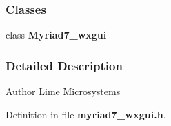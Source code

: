 \subsubsection*{Classes}
\begin{DoxyCompactItemize}
\item 
class {\bf Myriad7\+\_\+wxgui}
\end{DoxyCompactItemize}


\subsubsection{Detailed Description}
\begin{DoxyAuthor}{Author}
Lime Microsystems 
\end{DoxyAuthor}


Definition in file {\bf myriad7\+\_\+wxgui.\+h}.

